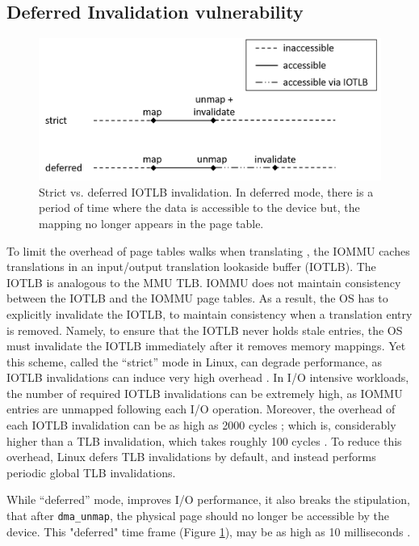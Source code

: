 \subsection{Deferred Invalidation vulnerability} 
\begin{figure}[t]
    \centering
    \includegraphics[width=1.3\columnwidth]{figs/deferred.png}
    \caption{Strict vs. deferred IOTLB invalidation. In deferred mode, there is a period of time
where the data is accessible to the device but, the mapping no longer appears in the page table.}
    \label{fig:deferred}
\end{figure}
To limit the overhead of page tables walks when translating \iova, the IOMMU caches translations in an input/output translation lookaside buffer (IOTLB). The IOTLB is analogous to the MMU TLB. IOMMU does not maintain consistency between the IOTLB and the IOMMU page tables. As a result, the OS has to explicitly invalidate the IOTLB, to maintain consistency when a translation entry is removed. Namely, to ensure that the IOTLB never holds stale entries, the OS must invalidate the IOTLB immediately after it removes memory mappings. Yet this scheme, called the “strict” mode in Linux, can degrade performance, as IOTLB invalidations can induce very high overhead \cite{MMT16,MSMT18,Peleg15}. In I/O intensive workloads, the number of required IOTLB invalidations can be extremely high, as IOMMU entries are unmapped following each I/O operation. Moreover, the overhead of each IOTLB invalidation can be as high as 2000 cycles \cite{ABYTS11}; which is, considerably higher than a TLB invalidation, which takes roughly 100 cycles \cite{Han14}. To reduce this overhead, Linux defers TLB invalidations by default, and instead performs periodic global TLB invalidations. 

While “deferred” mode, improves I/O performance, it also breaks the stipulation, that after \texttt{dma\_unmap}, the physical page should no longer be accessible by the device. This "deferred" time frame (Figure \ref{fig:deferred}), may be as high as 10 milliseconds \cite{MSMT18}.

